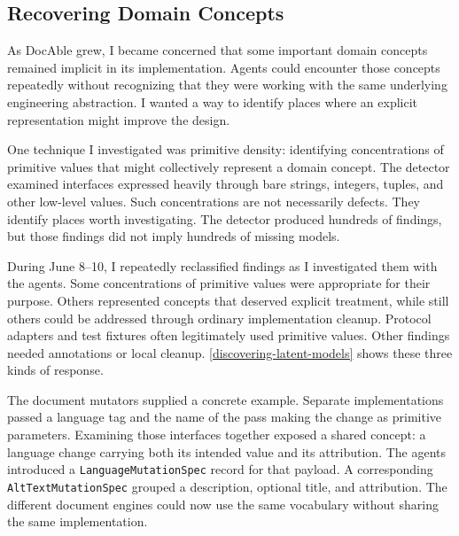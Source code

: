 \subsection{Recovering Domain Concepts}\label{heading:recovering-domain-concepts}

As DocAble grew, I became concerned that some important domain concepts remained implicit in its implementation. Agents could encounter those concepts repeatedly without recognizing that they were working with the same underlying engineering abstraction. I wanted a way to identify places where an explicit representation might improve the design.

One technique I investigated was primitive density: identifying concentrations of primitive values that might collectively represent a domain concept. The detector examined interfaces expressed heavily through bare strings, integers, tuples, and other low-level values. Such concentrations are not necessarily defects. They identify places worth investigating. The detector produced hundreds of findings, but those findings did not imply hundreds of missing models.

During June 8--10, I repeatedly reclassified findings as I investigated them with the agents. Some concentrations of primitive values were appropriate for their purpose. Others represented concepts that deserved explicit treatment, while still others could be addressed through ordinary implementation cleanup. Protocol adapters and test fixtures often legitimately used primitive values. Other findings needed annotations or local cleanup. \autoref{discovering-latent-models} shows these three kinds of response.

The document mutators supplied a concrete example. Separate implementations passed a language tag and the name of the pass making the change as primitive parameters. Examining those interfaces together exposed a shared concept: a language change carrying both its intended value and its attribution. The agents introduced a \texttt{LanguageMutationSpec} record for that payload. A corresponding \texttt{AltTextMutationSpec} grouped a description, optional title, and attribution. The different document engines could now use the same vocabulary without sharing the same implementation.

